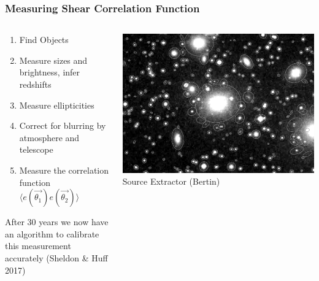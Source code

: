 \documentclass{beamer}
\begin{document}
{\begin{columns}
    \end{columns}


}

\frame
{

    \frametitle{Measuring Shear Correlation Function}


    \begin{columns}
        \begin{column}{0.5\textwidth}
            \begin{enumerate}

                \item Find Objects

                \item Measure sizes and brightness, infer redshifts
                    
                \item Measure ellipticities

                \item Correct for blurring by atmosphere and telescope

                \item Measure the correlation function
                    {\color{gold} $\langle e(\vec{\theta_1}) e(\vec{\theta_2}) \rangle$ }



            \end{enumerate}

            After 30 years we now have an algorithm to calibrate
                this measurement accurately (Sheldon \& Huff 2017)

        \end{column}
        \begin{column}{0.5\textwidth}

            \begin{center}
                \includegraphics[width=\textwidth]{sun226_fig.png}
                \newline
                {\tiny Source Extractor (Bertin)}
            \end{center}


\end{column}
\end{columns}}
\end{document}
